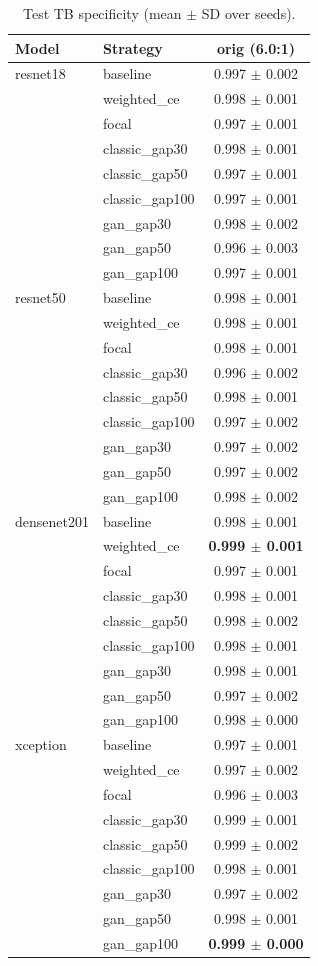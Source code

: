 \begin{table}[htbp]
\centering
\caption{Test TB specificity (mean $\pm$ SD over seeds).}
\label{tab:tb_specificity}
\begin{tabular}{llc}
\toprule
Model & Strategy & orig (6.0:1) \\
\midrule
resnet18 & baseline & 0.997 $\pm$ 0.002 \\
 & weighted\_ce & 0.998 $\pm$ 0.001 \\
 & focal & 0.997 $\pm$ 0.001 \\
 & classic\_gap30 & 0.998 $\pm$ 0.001 \\
 & classic\_gap50 & 0.997 $\pm$ 0.001 \\
 & classic\_gap100 & 0.997 $\pm$ 0.001 \\
 & gan\_gap30 & 0.998 $\pm$ 0.002 \\
 & gan\_gap50 & 0.996 $\pm$ 0.003 \\
 & gan\_gap100 & 0.997 $\pm$ 0.001 \\
\addlinespace
resnet50 & baseline & 0.998 $\pm$ 0.001 \\
 & weighted\_ce & 0.998 $\pm$ 0.001 \\
 & focal & 0.998 $\pm$ 0.001 \\
 & classic\_gap30 & 0.996 $\pm$ 0.002 \\
 & classic\_gap50 & 0.998 $\pm$ 0.001 \\
 & classic\_gap100 & 0.997 $\pm$ 0.002 \\
 & gan\_gap30 & 0.997 $\pm$ 0.002 \\
 & gan\_gap50 & 0.997 $\pm$ 0.002 \\
 & gan\_gap100 & 0.998 $\pm$ 0.002 \\
\addlinespace
densenet201 & baseline & 0.998 $\pm$ 0.001 \\
 & weighted\_ce & \textbf{0.999 $\pm$ 0.001} \\
 & focal & 0.997 $\pm$ 0.001 \\
 & classic\_gap30 & 0.998 $\pm$ 0.001 \\
 & classic\_gap50 & 0.998 $\pm$ 0.002 \\
 & classic\_gap100 & 0.998 $\pm$ 0.001 \\
 & gan\_gap30 & 0.998 $\pm$ 0.001 \\
 & gan\_gap50 & 0.997 $\pm$ 0.002 \\
 & gan\_gap100 & 0.998 $\pm$ 0.000 \\
\addlinespace
xception & baseline & 0.997 $\pm$ 0.001 \\
 & weighted\_ce & 0.997 $\pm$ 0.002 \\
 & focal & 0.996 $\pm$ 0.003 \\
 & classic\_gap30 & 0.999 $\pm$ 0.001 \\
 & classic\_gap50 & 0.999 $\pm$ 0.002 \\
 & classic\_gap100 & 0.998 $\pm$ 0.001 \\
 & gan\_gap30 & 0.997 $\pm$ 0.002 \\
 & gan\_gap50 & 0.998 $\pm$ 0.001 \\
 & gan\_gap100 & \textbf{0.999 $\pm$ 0.000} \\
\bottomrule
\end{tabular}
\end{table}